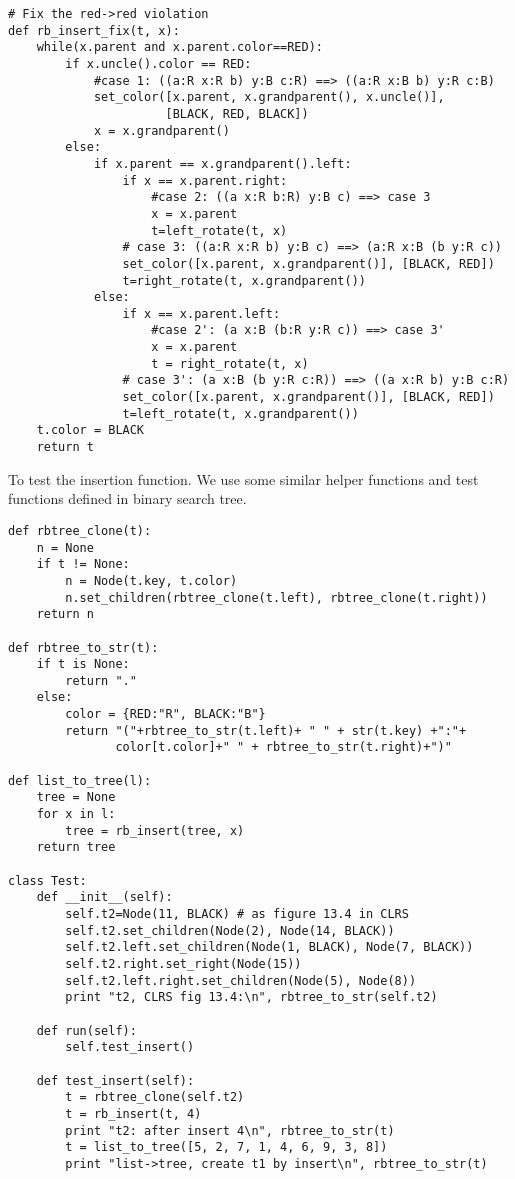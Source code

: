 \documentclass{article}
\begin{document}
\begin{lstlisting}
# Fix the red->red violation
def rb_insert_fix(t, x):
    while(x.parent and x.parent.color==RED):
        if x.uncle().color == RED:
            #case 1: ((a:R x:R b) y:B c:R) ==> ((a:R x:B b) y:R c:B)
            set_color([x.parent, x.grandparent(), x.uncle()],
                      [BLACK, RED, BLACK])
            x = x.grandparent()
        else:
            if x.parent == x.grandparent().left:
                if x == x.parent.right:
                    #case 2: ((a x:R b:R) y:B c) ==> case 3
                    x = x.parent
                    t=left_rotate(t, x)
                # case 3: ((a:R x:R b) y:B c) ==> (a:R x:B (b y:R c))
                set_color([x.parent, x.grandparent()], [BLACK, RED])
                t=right_rotate(t, x.grandparent())
            else:
                if x == x.parent.left:
                    #case 2': (a x:B (b:R y:R c)) ==> case 3'
                    x = x.parent
                    t = right_rotate(t, x)
                # case 3': (a x:B (b y:R c:R)) ==> ((a x:R b) y:B c:R)
                set_color([x.parent, x.grandparent()], [BLACK, RED])
                t=left_rotate(t, x.grandparent())
    t.color = BLACK
    return t
\end{lstlisting}

To test the insertion function. We use some similar helper functions and test functions defined in binary search tree\cite{bst-lxy}.

\begin{lstlisting}
def rbtree_clone(t):
    n = None
    if t != None:
        n = Node(t.key, t.color)
        n.set_children(rbtree_clone(t.left), rbtree_clone(t.right))
    return n

def rbtree_to_str(t):
    if t is None:
        return "."
    else:
        color = {RED:"R", BLACK:"B"}
        return "("+rbtree_to_str(t.left)+ " " + str(t.key) +":"+
               color[t.color]+" " + rbtree_to_str(t.right)+")"

def list_to_tree(l):
    tree = None
    for x in l:
        tree = rb_insert(tree, x)
    return tree

class Test:
    def __init__(self):
        self.t2=Node(11, BLACK) # as figure 13.4 in CLRS
        self.t2.set_children(Node(2), Node(14, BLACK))
        self.t2.left.set_children(Node(1, BLACK), Node(7, BLACK))
        self.t2.right.set_right(Node(15))
        self.t2.left.right.set_children(Node(5), Node(8))
        print "t2, CLRS fig 13.4:\n", rbtree_to_str(self.t2)

    def run(self):
        self.test_insert()

    def test_insert(self):
        t = rbtree_clone(self.t2)
        t = rb_insert(t, 4)
        print "t2: after insert 4\n", rbtree_to_str(t)
        t = list_to_tree([5, 2, 7, 1, 4, 6, 9, 3, 8])
        print "list->tree, create t1 by insert\n", rbtree_to_str(t)
\end{lstlisting}
\end{document}
